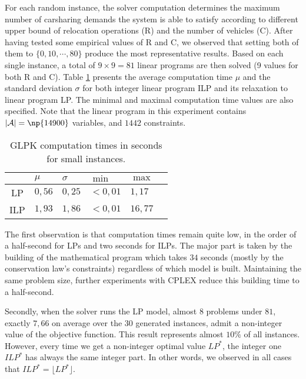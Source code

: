 For each random instance, the solver computation determines the maximum number of carsharing demands the system is able to satisfy according to different upper bound of relocation operations (R) and the number of vehicles (C).
After having tested some empirical values of R and C, we observed that setting both of them to $\{0, 10, \cdots, 80\}$ produce the most representative results.
Based on each single instance, a total of $9 \times 9 = 81$ linear programs are then solved (9 values for both R and C).
Table \ref{table:computationTimes} presents the average computation time $\mu$ and the standard deviation $\sigma$ for both integer linear program ILP and its relaxation to linear program LP.
The minimal and maximal computation time values are also specified.
Note that the linear program in this experiment contains $|\tegArcSet| = \np{14900}$ variables, and  $1442$ constraints.

\begin{table}[t]
\renewcommand{\arraystretch}{2.3}
\centering
\begin{tabularx}{.8\linewidth}{|c|*{5}{>{\centering \arraybackslash}X|}}
\cline{2-5}
\multicolumn{1}{c|}{} & $\mu$ & $\sigma$ & $\min$ & $\max$ \\
\hline
LP  & $0,56$ & $0,25$ &	$<0,01$ &  $1,17$ \\
ILP & $1,93$ & $1,86$ &	$<0,01$ & $16,77$ \\
\hline
\end{tabularx}
\caption{GLPK computation times in seconds for small instances.}
\label{table:computationTimes}
\end{table}

\bigskip
The first observation is that computation times remain quite low, in the order of a half-second for LPs and two seconds for ILPs.
The major part is taken by the building of the mathematical program which takes $34$ seconds (mostly  by the conservation law's constraints) regardless of which model is built.
Maintaining the same problem size, further experiments with CPLEX reduce this building time to a half-second.

\bigskip
Secondly, when the solver runs the LP model, almost $8$ problems under $81$, exactly $7,66$ on average over the $30$ generated instances, admit a non-integer value of the objective function.
This result represents almost $10\%$ of all instances.
However, every time we get a non-integer optimal value $LP^*$, the integer one $ILP^*$ has always the same integer part.
In other words, we observed in all cases that $ILP^* = \lfloor LP^* \rfloor$.


